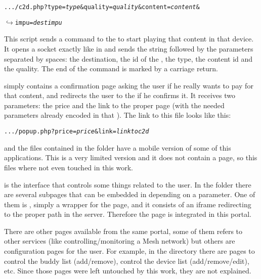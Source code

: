 \texttt{.../c2d.php?type=\emph{type}\&quality=\emph{quality}\&content=\emph{content}\&}

$\hookrightarrow$\texttt{impu=\emph{destimpu}}

This script sends a command to the  to start playing that content in that device.
It opens a socket exactly like in  and sends the string  followed by the parameters separated by spaces: the destination, the  id of the , the type, the content id and the quality.
The end of the command is marked by a carriage return.

 simply contains a confirmation page asking the user if he really wants to pay for that content, and redirects the user to the  if he confirms it.
It receives two  parameters: the price and the link to the proper  page (with the needed parameters already encoded in that ).
The link to this  file looks like this:

\texttt{.../popup.php?price=\emph{price}\&link=\emph{linktoc2d}}

 and the files contained in the  folder have a mobile version of some of this applications.
This is a very limited version and it does not contain a  page, so this files where not even touched in this work.

 is the interface that controls some things related to the user.
In the  folder there are several subpages that can be embedded in  depending on a  parameter.
One of them is , simply a wrapper for the  page, and it consists of an iframe redirecting to the proper path in the  server.
Therefore the  page is integrated in this portal.

There are other pages available from the same portal, some of them refers to other services (like controlling/monitoring a Mesh network) but others are configuration pages for the user.
For example, in the  directory there are pages to control the buddy list (add/remove), control the device list (add/remove/edit), etc.
Since those pages were left untouched by this work, they are not explained.


